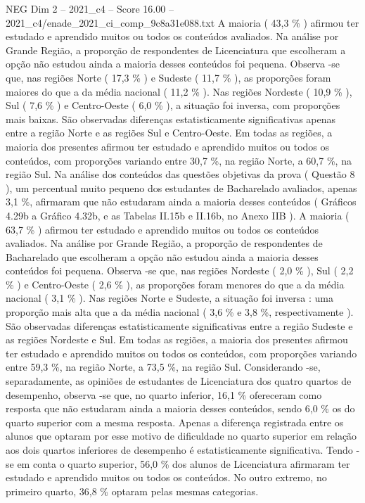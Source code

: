 \begin{textsample}{NEG Dim 2 – 2021\_c4 – Score 16.00 – 2021\_c4/enade\_2021\_ci\_comp\_9c8a31e088.txt}
A maioria ( 43,3 \% ) afirmou ter estudado e aprendido muitos ou todos os conteúdos avaliados.
Na análise por Grande Região, a proporção de respondentes de Licenciatura que escolheram a opção não estudou ainda a maioria desses conteúdos foi pequena.
Observa -se que, nas regiões Norte ( 17,3 \% ) e Sudeste ( 11,7 \% ), as proporções foram maiores do que a da média nacional ( 11,2 \% ).
Nas regiões Nordeste ( 10,9 \% ), Sul ( 7,6 \% ) e Centro-Oeste ( 6,0 \% ), a situação foi inversa, com proporções mais baixas.
São observadas diferenças estatisticamente significativas apenas entre a região Norte e as regiões Sul e Centro-Oeste.
Em todas as regiões, a maioria dos presentes afirmou ter estudado e aprendido muitos ou todos os conteúdos, com proporções variando entre 30,7 \%, na região Norte, a 60,7 \%, na região Sul.
Na análise dos conteúdos das questões objetivas da prova ( Questão 8 ), um percentual muito pequeno dos estudantes de Bacharelado avaliados, apenas 3,1 \%, afirmaram que não estudaram ainda a maioria desses conteúdos ( Gráficos 4.29b a Gráfico 4.32b, e as Tabelas II.15b e II.16b, no Anexo IIB ).
A maioria ( 63,7 \% ) afirmou ter estudado e aprendido muitos ou todos os conteúdos avaliados.
Na análise por Grande Região, a proporção de respondentes de Bacharelado que escolheram a opção não estudou ainda a maioria desses conteúdos foi pequena.
Observa -se que, nas regiões Nordeste ( 2,0 \% ), Sul ( 2,2 \% ) e Centro-Oeste ( 2,6 \% ), as proporções foram menores do que a da média nacional ( 3,1 \% ).
Nas regiões Norte e Sudeste, a situação foi inversa : uma proporção mais alta que a da média nacional ( 3,6 \% e 3,8 \%, respectivamente ).
São observadas diferenças estatisticamente significativas entre a região Sudeste e as regiões Nordeste e Sul.
Em todas as regiões, a maioria dos presentes afirmou ter estudado e aprendido muitos ou todos os conteúdos, com proporções variando entre 59,3 \%, na região Norte, a 73,5 \%, na região Sul.
Considerando -se, separadamente, as opiniões de estudantes de Licenciatura dos quatro quartos de desempenho, observa -se que, no quarto inferior, 16,1 \% ofereceram como resposta que não estudaram ainda a maioria desses conteúdos, sendo 6,0 \% os do quarto superior com a mesma resposta.
Apenas a diferença registrada entre os alunos que optaram por esse motivo de dificuldade no quarto superior em relação aos dois quartos inferiores de desempenho é estatisticamente significativa.
Tendo -se em conta o quarto superior, 56,0 \% dos alunos de Licenciatura afirmaram ter estudado e aprendido muitos ou todos os conteúdos.
No outro extremo, no primeiro quarto, 36,8 \% optaram pelas mesmas categorias.

\end{textsample}
